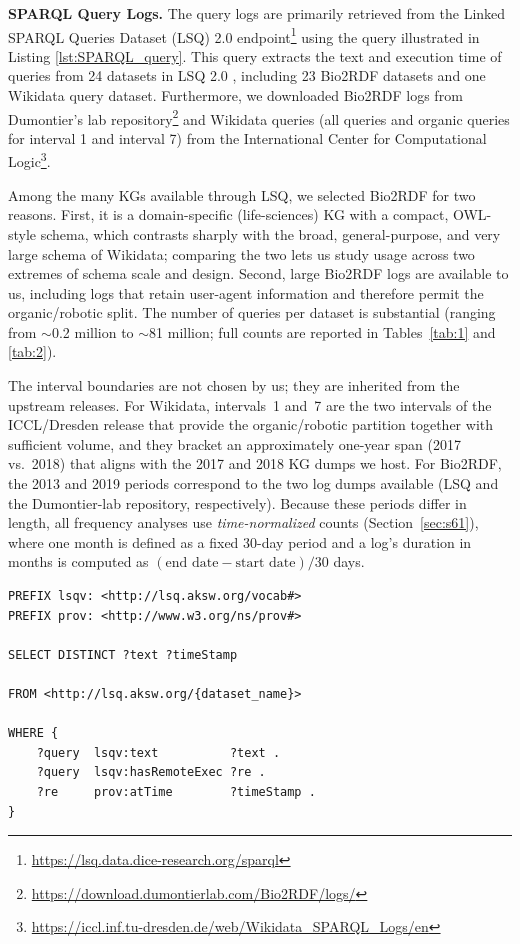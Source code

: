 \documentclass[sw]{iosart2x}
\begin{document}
\textbf{SPARQL Query Logs. }
The query logs are primarily retrieved from the Linked SPARQL Queries Dataset (LSQ) 2.0 endpoint\footnote{\url{https://lsq.data.dice-research.org/sparql}} using the query illustrated in Listing \ref{lst:SPARQL_query}. This query extracts the text and execution time of queries from 24 datasets in LSQ 2.0 \cite{stadler2024lsq}, including 23 Bio2RDF datasets and one Wikidata query dataset.
Furthermore, we downloaded Bio2RDF logs from Dumontier’s lab repository\footnote{\url{https://download.dumontierlab.com/Bio2RDF/logs/}} and Wikidata queries (all queries and organic queries for interval 1 and interval 7) from the International Center for Computational Logic\footnote{\url{https://iccl.inf.tu-dresden.de/web/Wikidata_SPARQL_Logs/en}}.

Among the many KGs available through LSQ, we selected Bio2RDF for two reasons. First, it is a domain-specific (life-sciences) KG with a compact, OWL-style schema, which contrasts sharply with the broad, general-purpose, and very large schema of Wikidata; comparing the two lets us study usage across two extremes of schema scale and design. Second, large Bio2RDF logs are available to us, including logs that retain user-agent information and therefore permit the organic/robotic split. The number of queries per dataset is substantial (ranging from $\sim$0.2 million to $\sim$81 million; full counts are reported in Tables~\ref{tab:1} and \ref{tab:2}).

The interval boundaries are not chosen by us; they are inherited from the upstream releases. For Wikidata, intervals~1 and~7 are the two intervals of the ICCL/Dresden release that provide the organic/robotic partition together with sufficient volume, and they bracket an approximately one-year span (2017 vs.\ 2018) that aligns with the 2017 and 2018 KG dumps we host. For Bio2RDF, the 2013 and 2019 periods correspond to the two log dumps available (LSQ and the Dumontier-lab repository, respectively). Because these periods differ in length, all frequency analyses use \emph{time-normalized} counts (Section~\ref{sec:s61}), where one month is defined as a fixed 30-day period and a log's duration in months is computed as $(\text{end date}-\text{start date})/30$ days.


\begin{center}
\begin{minipage}{0.8\textwidth}  %
\begin{lstlisting}[label={lst:SPARQL_query},linewidth=\linewidth, caption={The templated SPARQL query against the LSQ SPARQL endpoint to retrieve SPARQL queries for selected datasets.}]
PREFIX lsqv: <http://lsq.aksw.org/vocab#>
PREFIX prov: <http://www.w3.org/ns/prov#>

SELECT DISTINCT ?text ?timeStamp

FROM <http://lsq.aksw.org/{dataset_name}>

WHERE {
    ?query  lsqv:text          ?text .
    ?query  lsqv:hasRemoteExec ?re .
    ?re     prov:atTime        ?timeStamp .
}
\end{lstlisting}
\end{minipage}
\end{center}
\end{document}
